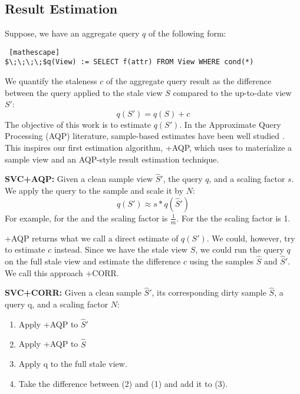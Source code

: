 \subsection{Result Estimation}
Suppose, we have an aggregate query $q$ of the following form:
\begin{lstlisting} [mathescape]
$\;\;\;\;$q(View) := SELECT f(attr) FROM View WHERE cond(*)
\end{lstlisting}
We quantify the staleness $c$ of the aggregate query result as the difference
between the query applied to the stale view $S$ compared to the up-to-date view $S'$:
\[
q(S') = q(S) + c
\]
The objective of this work is to estimate $q(S')$.
In the Approximate Query Processing (AQP) literature, sample-based estimates have been well studied \cite{OlkenR86, AgarwalMPMMS13}.
This inspires our first estimation algorithm, \svcnospace+AQP, which uses \svc to materialize a sample view and an AQP-style
result estimation technique.

\vspace{0.25em}

\noindent\textbf{SVC+AQP: }  Given a clean sample view $\widehat{S}'$, the query $q$, and a scaling factor $s$. 
We apply the query to the sample and scale it by $N$: 
\[
q(S') \approx s*q(\widehat{S}')
\]
For example, for the \sumfunc and \countfunc the scaling factor is $\frac{1}{m}$. For the \avgfunc the scaling factor is 1.

\svcnospace+AQP returns what we call a direct estimate of $q(S')$.
We could, however, try to estimate $c$ instead.
Since we have the stale view $S$, we could run the query $q$ on the full stale view and 
estimate the difference $c$ using the samples $\widehat{S}$ and $\widehat{S}'$.
We call this approach \svcnospace+CORR.

\vspace{0.25em}

\noindent\textbf{SVC+CORR: } Given a clean sample $\widehat{S}'$, its corresponding dirty sample $\widehat{S}$, a query q, and a scaling factor $N$: 
\begin{enumerate}[noitemsep]
\item Apply \svcnospace+AQP to $\widehat{S}'$ 
\item Apply \svcnospace+AQP to $\widehat{S}$
\item Apply q to the full stale view.
\item Take the difference between (2) and (1) and add it to (3).
\end{enumerate}

